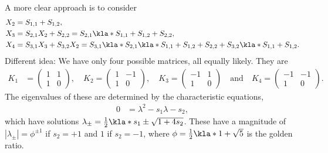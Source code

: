 \documentclass[english, parskip=full]{scrartcl}
\begin{document}
A more clear approach is to consider
\begin{align}
X_2 &= S_{1,1} + S_{1,2},\\
X_3 &= S_{2,1}X_2 + S_{2,2} = S_{2,1} \kla*{S_{1,1} + S_{1,2}} + S_{2,2},\\
X_4 &= S_{3,1}X_3 + S_{3,2}X_2 = S_{3,1} \kla*{S_{2,1} \kla*{S_{1,1} + S_{1,2}} + S_{2,2}} + S_{3,2} \kla*{S_{1,1} + S_{1,2}}.
\end{align}
Different idea:
We have only four possible matrices, all equally likely.
They are
\begin{align}
K_1 &= \begin{pmatrix}
1 & 1 \\ 1 & 0
\end{pmatrix}, \quad K_2 = \begin{pmatrix}
1 & -1 \\ 1 & 0
\end{pmatrix}, \quad K_3 = \begin{pmatrix}
-1 & 1 \\ 1 & 0
\end{pmatrix} \quad\text{and}\quad K_4 = \begin{pmatrix}
-1 & -1 \\ 1 & 0
\end{pmatrix}.
\end{align}
The eigenvalues of these are determined by the characteristic equations,
\begin{align}
0 &= \lambda^2 - s_1\lambda - s_2,
\end{align}
which have solutions $\lambda_\pm = \frac{1}{2}\kla*{s_1 \pm \sqrt{1 + 4s_2}}$.
These have a magnitude of $|\lambda_\pm| = \phi^{\pm 1}$ if $s_2=+1$ and $1$ if $s_2=-1$, where $\phi = \frac{1}{2} \kla*{1 + \sqrt{5}}$ is the golden ratio.
\end{document}
